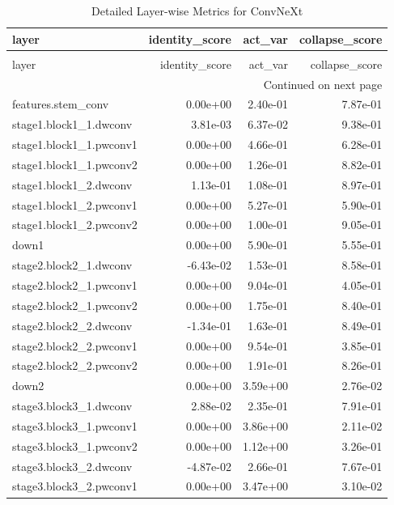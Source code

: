 \begin{longtable}{lrrr}
\caption{Detailed Layer-wise Metrics for ConvNeXt} \label{tab:layer_metrics_convnext} \\
\toprule
layer & identity_score & act_var & collapse_score \\
\midrule
\endfirsthead
\caption[]{Detailed Layer-wise Metrics for ConvNeXt} \\
\toprule
layer & identity_score & act_var & collapse_score \\
\midrule
\endhead
\midrule
\multicolumn{4}{r}{Continued on next page} \\
\midrule
\endfoot
\bottomrule
\endlastfoot
features.stem_conv & 0.00e+00 & 2.40e-01 & 7.87e-01 \\
stage1.block1_1.dwconv & 3.81e-03 & 6.37e-02 & 9.38e-01 \\
stage1.block1_1.pwconv1 & 0.00e+00 & 4.66e-01 & 6.28e-01 \\
stage1.block1_1.pwconv2 & 0.00e+00 & 1.26e-01 & 8.82e-01 \\
stage1.block1_2.dwconv & 1.13e-01 & 1.08e-01 & 8.97e-01 \\
stage1.block1_2.pwconv1 & 0.00e+00 & 5.27e-01 & 5.90e-01 \\
stage1.block1_2.pwconv2 & 0.00e+00 & 1.00e-01 & 9.05e-01 \\
down1 & 0.00e+00 & 5.90e-01 & 5.55e-01 \\
stage2.block2_1.dwconv & -6.43e-02 & 1.53e-01 & 8.58e-01 \\
stage2.block2_1.pwconv1 & 0.00e+00 & 9.04e-01 & 4.05e-01 \\
stage2.block2_1.pwconv2 & 0.00e+00 & 1.75e-01 & 8.40e-01 \\
stage2.block2_2.dwconv & -1.34e-01 & 1.63e-01 & 8.49e-01 \\
stage2.block2_2.pwconv1 & 0.00e+00 & 9.54e-01 & 3.85e-01 \\
stage2.block2_2.pwconv2 & 0.00e+00 & 1.91e-01 & 8.26e-01 \\
down2 & 0.00e+00 & 3.59e+00 & 2.76e-02 \\
stage3.block3_1.dwconv & 2.88e-02 & 2.35e-01 & 7.91e-01 \\
stage3.block3_1.pwconv1 & 0.00e+00 & 3.86e+00 & 2.11e-02 \\
stage3.block3_1.pwconv2 & 0.00e+00 & 1.12e+00 & 3.26e-01 \\
stage3.block3_2.dwconv & -4.87e-02 & 2.66e-01 & 7.67e-01 \\
stage3.block3_2.pwconv1 & 0.00e+00 & 3.47e+00 & 3.10e-02 \\

\end{longtable}
